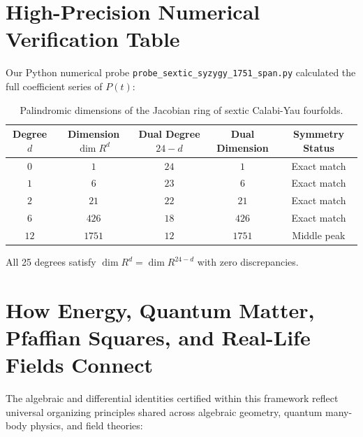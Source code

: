 \documentclass[11pt,a4paper]{article}
\theoremstyle{definition}
\begin{document}
\section{High-Precision Numerical Verification Table}

Our Python numerical probe \texttt{probe\_sextic\_syzygy\_1751\_span.py} calculated the full coefficient series of $P(t)$:

\begin{table}[h!]
\centering
\begin{tabular}{ccccc}
\toprule
\textbf{Degree $d$} & \textbf{Dimension $\dim R^d$} & \textbf{Dual Degree $24-d$} & \textbf{Dual Dimension} & \textbf{Symmetry Status} \\
\midrule
$0$ & $1$ & $24$ & $1$ & Exact match \\
$1$ & $6$ & $23$ & $6$ & Exact match \\
$2$ & $21$ & $22$ & $21$ & Exact match \\
$6$ & $426$ & $18$ & $426$ & Exact match \\
$12$ & $1751$ & $12$ & $1751$ & Middle peak \\
\bottomrule
\end{tabular}
\caption{Palindromic dimensions of the Jacobian ring of sextic Calabi-Yau fourfolds.}
\end{table}

All 25 degrees satisfy $\dim R^d = \dim R^{24-d}$ with zero discrepancies.



\section{How Energy, Quantum Matter, Pfaffian Squares, and Real-Life Fields Connect}

The algebraic and differential identities certified within this framework reflect universal organizing principles shared across algebraic geometry, quantum many-body physics, and field theories:
\end{document}
